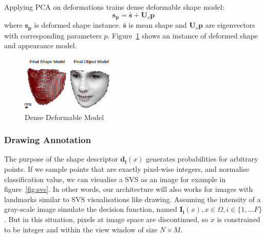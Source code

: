 Applying PCA on deformations trains dense deformable shape model:
\begin{equation*}
    \bm{s_p}=\bm{\bar{s}} + \bm{U}_s\bm{p}
\end{equation*}
where $\bm{s_p}$ is deformed shape instance. $\bm{\bar{s}}$ is mean shape and $\bm{U}_s\bm{p}$ are eigenvectors with corresponding parameters $p$. Figure~\ref{fig:models} shows an instance of deformed shape and appearance model.
\begin{figure}[h!]
    \centering
        \includegraphics[width=0.4\textwidth]{resources/models}
    \caption{Dense Deformable Model}
    \label{fig:models}
\end{figure}

\subsubsection{Drawing Annotation}

The purpose of the shape descriptor $\bm{d_i}(x)$ generates probabilities for arbitrary points. If we sample points that are exactly pixel-wise integers, and normalise classification value, we can visualise a SVS as an image for example in figure~\ref{fig:svs}. In other words, our architecture will also works for images with landmarks similar to SVS visualisations like drawing. Assuming the intensity of a gray-scale image simulate the decision function, named $\bm{I_i}(x), x \in \Omega, i \in \{1,...F\}$. But in this situation, pixels at image space are discontinued, so $x$ is constrained to be integer and within the view window of size $N\times M$.





\clearpage 